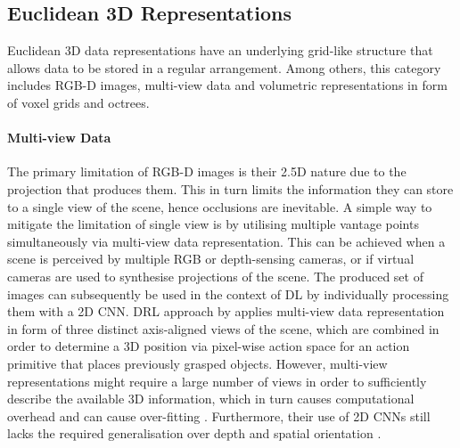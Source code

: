 \subsection{Euclidean 3D Representations}

Euclidean 3D data representations have an underlying grid-like structure that allows data to be stored in a regular arrangement. Among others, this category includes RGB-D images, multi-view data and volumetric representations in form of voxel grids and octrees.


\paragraph{Multi-view Data} The primary limitation of RGB-D images is their 2.5D nature due to the projection that produces them. This in turn limits the information they can store to a single view of the scene, hence occlusions are inevitable. A simple way to mitigate the limitation of single view is by utilising multiple vantage points simultaneously via multi-view data representation. This can be achieved when a scene is perceived by multiple RGB or depth-sensing cameras, or if virtual cameras are used to synthesise projections of the scene. The produced set of images can subsequently be used in the context of DL by individually processing them with a 2D CNN. DRL approach by \citet{gualtieri_learning_2018} applies multi-view data representation in form of three distinct axis-aligned views of the scene, which are combined in order to determine a 3D position via pixel-wise action space for an action primitive that places previously grasped objects. However, multi-view representations might require a large number of views in order to sufficiently describe the available 3D information, which in turn causes computational overhead and can cause over-fitting \cite{ahmed_deep_2018}. Furthermore, their use of 2D CNNs still lacks the required generalisation over depth and spatial orientation \cite{gualtieri_pick_2018}.


